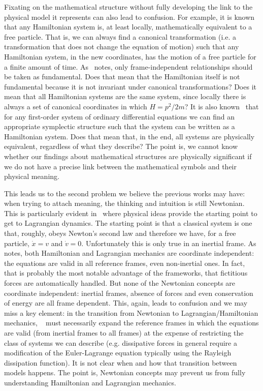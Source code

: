 \documentclass[11pt]{elsarticle}
\begin{document}
Fixating on the mathematical structure without fully developing the link to the physical model it represents can also lead to confusion. For example, it is known~\cite{AllHamFreeParticle} that any Hamiltonian system is, at least locally, mathematically equivalent to a free particle. That is, we can always find a canonical transformation (i.e. a transformation that does not change the equation of motion) such that any Hamiltonian system, in the new coordinates, has the motion of a free particle for a finite amount of time. As~\cite{North} notes, only frame-independent relationships should be taken as fundamental. Does that mean that the Hamiltonian itself is not fundamental because it is not invariant under canonical transformations? Does it mean that all Hamiltonian systems are the same system, since locally there is always a set of canonical coordinates in which $H=p^2/2m$? It is also known~\cite{AllSystemsAreHam} that for any first-order system of ordinary differential equations we can find an appropriate symplectic structure such that the system can be written as a Hamiltonian system. Does that mean that, in the end, all systems are physically equivalent, regardless of what they describe? The point is, we cannot know whether our findings about mathematical structures are physically significant if we do not have a precise link between the mathematical symbols and their physical meaning.

This leads us to the second problem we believe the previous works may have: when trying to attach meaning, the thinking and intuition is still Newtonian. This is particularly evident in~\cite{Curiel} where physical ideas provide the starting point to get to Lagrangian dynamics. The starting point is that a classical system is one that, roughly, obeys Newton's second law and therefore we have, for a free particle, $\dot{x} = v$ and $\dot{v} = 0$. Unfortunately this is only true in an inertial frame. As~\cite{North} notes, both Hamiltonian and Lagrangian mechanics are coordinate independent: the equations are valid in all reference frames, even non-inertial ones. In fact, that is probably the most notable advantage of the frameworks, that fictitious forces are automatically handled. But none of the Newtonian concepts are coordinate independent: inertial frames, absence of forces and even conservation of energy are all frame dependent. This, again, leads to confusion and we may miss a key element: in the transition from Newtonian to Lagrangian/Hamiltonian mechanics, ~\cite{Curiel} must necessarily expand the reference frames in which the equations are valid (from inertial frames to all frames) at the expense of restricting the class of systems we can describe (e.g. dissipative forces in general require a modification of the Euler-Lagrange equation typically using the Rayleigh dissipation function). It is not clear when and how that transition between models happens. The point is, Newtonian concepts may prevent us from fully understanding Hamiltonian and Lagrangian mechanics.
\end{document}
